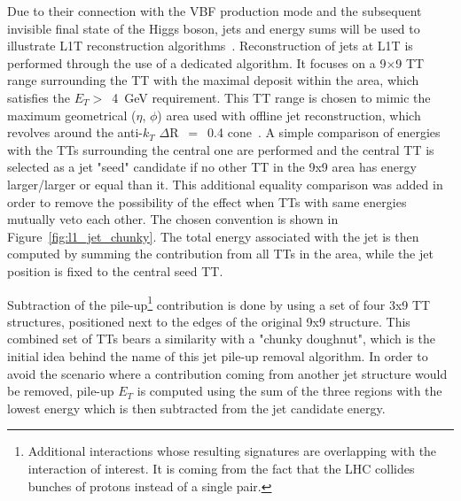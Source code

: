 \hspace{10pt} Due to their connection with the VBF production mode and the subsequent invisible final state of the Higgs boson, jets and energy sums will be used to illustrate L1T reconstruction algorithms~\cite{cms:l1_paper,Antoni}. Reconstruction of jets at L1T is performed through the use of a dedicated algorithm. It focuses on a 9$\times$9 TT range surrounding the TT with the maximal deposit within the area, which satisfies the $E_T>$~4~GeV requirement. This TT range is chosen to mimic the maximum geometrical ($\eta$, $\phi$) area used with offline jet reconstruction, which revolves around the anti-$k_T$ $\Delta$R~$=$~0.4 cone~\cite{anti_kt}. A simple comparison of energies with the TTs surrounding the central one are performed and the central TT is selected as a jet "seed" candidate if no other TT in the 9x9 area has energy larger/larger or equal than it. This additional equality comparison was added in order to remove the possibility of the effect when TTs with same energies mutually veto each other. The chosen convention is shown in Figure~\ref{fig:l1_jet_chunky}. The total energy associated with the jet is then computed by summing the contribution from all TTs in the area, while the jet position is fixed to the central seed TT. 

\hspace{10pt} Subtraction of the pile-up\footnote{Additional interactions whose resulting signatures are overlapping with the interaction of interest. It is coming from the fact that the LHC collides bunches of protons instead of a single pair.} contribution is done by using a set of four 3x9 TT structures, positioned next to the edges of the original 9x9 structure. This combined set of TTs bears a similarity with a "chunky doughnut", which is the initial idea behind the name of this jet pile-up removal algorithm. In order to avoid the scenario where a contribution coming from another jet structure would be removed, pile-up $E_T$ is computed using the sum of the three regions with the lowest energy which is then subtracted from the jet candidate energy.
 
